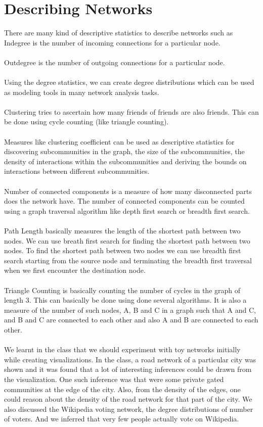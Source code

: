 \section{Describing Networks}
There are many kind of descriptive statistics to describe networks such as 
Indegree is the number of incoming connections for a particular node.
\\
\\
Outdegree is the number of outgoing connections for a particular node.
\\
\\
Using the degree statistics, we can create degree distributions which can be used as modeling tools in many network analysis tasks.
\\
\\
Clustering tries to ascertain how many friends of friends are also friends.  This can be done using cycle counting (like triangle counting).
\\
\\
Measures like clustering coefficient can be used as descriptive statistics for discovering subcommunities in the graph, the size of the subcommunities, the density of interactions within the subcommunities and deriving the bounds on interactions between different subcommunities.
\\
\\
Number of connected components is a measure of how many disconnected parts does the network have.  The number of connected components can be counted using a graph traversal algorithm like depth first search or breadth first search.
\\
\\
Path Length basically measures the length of the shortest path between two nodes. We can use breath first search for finding the shortest path between two nodes.
To find the shortest path between two nodes we can use breadth first search starting from the source node and terminating the breadth first traversal when we first encounter the destination node.
\\
\\
Triangle Counting is basically counting the number of cycles in the graph of length 3. This can basically be done using done several algorithms. It is also a measure of the number of such nodes, A, B and C in a graph such that A and C, and B and C are connected to each other and also A and B are connected to each other.
\\
\\
We learnt in the class that we should experiment with toy networks initially while creating visualizations. In the class, a road network of a particular city was shown and it was found that a lot of interesting inferences could be drawn from the visualization. One such inference was that were some private gated communities at the edge of the city. Also, from the density of the edges, one could reason about the density of the road network for that part of the city.
We also discussed the Wikipedia voting network, the degree distributions of number of voters. And we inferred that very few people actually vote on Wikipedia.

